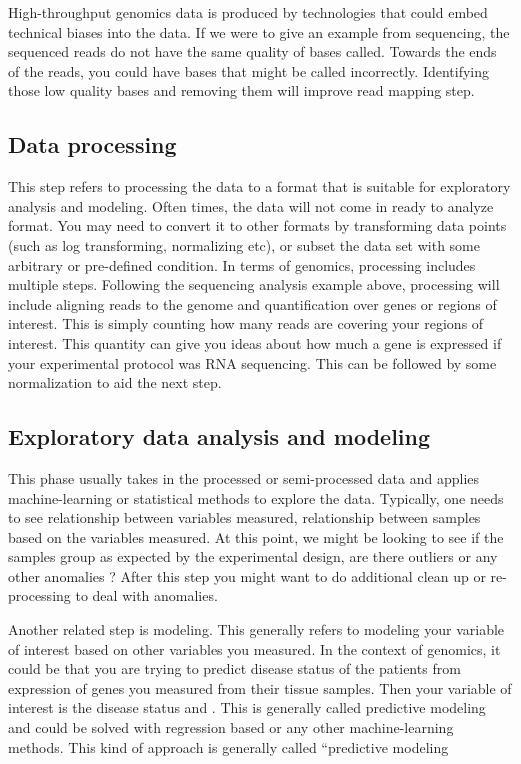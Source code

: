 High-throughput genomics data is produced by technologies that could embed technical biases into the data. If we were to give an example from sequencing, the sequenced reads do not have the same quality of bases called. Towards the ends of the reads, you could have bases that might be called incorrectly. Identifying those low quality bases and removing them will improve read mapping step\cite{edwards2013beginner}.

\subsection{Data processing}
This step refers to processing the data to a format that is suitable for exploratory analysis and modeling. Often times, the data will not come in ready to analyze format. You may need to convert it to other formats by transforming data points (such as log transforming, normalizing etc), or subset the data set with some arbitrary or pre-defined condition. In terms of genomics, processing includes multiple steps. Following the sequencing analysis example above, processing will include aligning reads to the genome and quantification over genes or regions of interest. This is simply counting how many reads are covering your regions of interest. This quantity can give you ideas about how much a gene is expressed if your experimental protocol was RNA sequencing. This can be followed by some normalization to aid the next step.

\subsection{Exploratory data analysis and modeling}  
This phase usually takes in the processed or semi-processed data and applies machine-learning or statistical methods to explore the data. Typically, one needs to see relationship between variables measured, relationship between samples based on the variables measured. At this point, we might be looking to see if the samples group as expected by the experimental design, are there outliers or any other anomalies ? After this step you might want to do additional clean up or re-processing to deal with anomalies.

Another related step is modeling. This generally refers to modeling your variable of interest based on other variables you measured. In the context of genomics, it could be that you are trying to predict disease status of the patients from expression of genes you measured from their tissue samples. Then your variable of interest is the disease status and . This is generally called predictive modeling and could be solved with regression based or any other machine-learning methods. This kind of approach is generally called “predictive modeling

